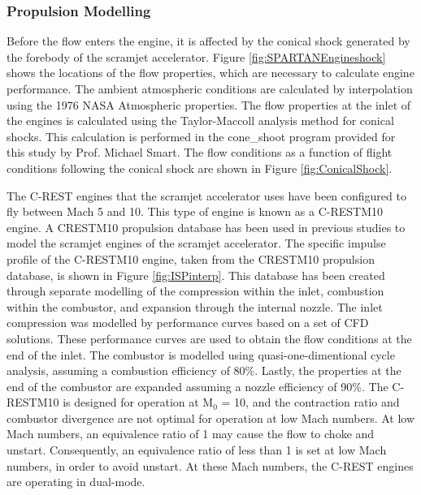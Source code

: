 \subsubsection{Propulsion Modelling}\label{sec:Propulsion}
Before the flow enters the engine, it is affected by the conical shock generated by the forebody of the scramjet accelerator.
Figure \ref{fig:SPARTANEngineshock} shows the locations of the flow properties, which are necessary to calculate engine performance. The ambient atmospheric conditions are calculated by interpolation using the 1976 NASA Atmospheric properties\cite{Administration1976}.
The flow properties at the inlet of the engines is calculated using the Taylor-Maccoll analysis method for conical shocks\cite{TaylorMaccoll}. This calculation is performed in the \textsf{cone\_shoot} program provided for this study by Prof. Michael Smart. The flow conditions as a function of flight conditions following the conical shock are shown in Figure \ref{fig:ConicalShock}.  


The C-REST engines that the scramjet accelerator uses have been configured to fly between Mach 5 and 10. This type of engine is known as a C-RESTM10 engine\cite{Preller2017b}.  
A \textsf{CRESTM10} propulsion database has been used in previous studies to model the scramjet engines of the scramjet accelerator\cite{Preller2017b}. The specific impulse profile of the C-RESTM10 engine, taken from the \textsf{CRESTM10} propulsion database, is shown in Figure \ref{fig:ISPinterp}. This database has been created through separate modelling of the compression within the inlet, combustion within the combustor, and expansion through the internal nozzle\cite{Jazra2010,Preller2018a}. The inlet compression was modelled by performance curves based on a set of CFD solutions\cite{Jazra2010,Preller2018a}. These performance curves are used to obtain the flow conditions at the end of the inlet. The combustor is modelled using quasi-one-dimentional cycle analysis, assuming a combustion efficiency of 80\%\cite{Jazra2010,Preller2018a}. Lastly, the properties at the end of the combustor are expanded assuming a nozzle efficiency of 90\%\cite{Preller2018a}.
The C-RESTM10 is designed for operation at M$_0$ = 10, and the contraction ratio and combustor divergence are not optimal for operation at low Mach numbers. At low Mach numbers, an equivalence ratio of 1 may cause the flow to choke and unstart. 
Consequently, an equivalence ratio of less than 1 is set at low Mach numbers, in order to avoid unstart\cite{Preller2018a}. At these Mach numbers, the C-REST engines are operating in dual-mode\cite{Preller2018a}. 

